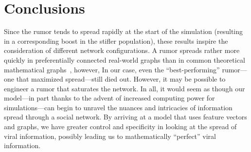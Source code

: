 \section{Conclusions}
\label{sec:conclusions}
Since the rumor tends to spread rapidly at the start of the simulation (resulting in a corresponding boost in the stifler population), these results inspire the consideration of different network configurations.
A rumor spreads rather more quickly in preferentially connected real-world graphs than in common theoretical mathematical graphs~\cite{doerr-2012}, however, In our case, even the ``best-performing'' rumor---one that maximized spread---still died out.
However, it may be possible to engineer a rumor that saturates the network.
In all, it would seem as though our model---in part thanks to the advent of increased computing power for simulations---can begin to unravel the nuances and intricacies of information spread through a social network.
By arriving at a model that uses feature vectors and graphs, we have greater control and specificity in looking at the spread of viral information, possibly leading us to mathematically ``perfect'' viral information.
